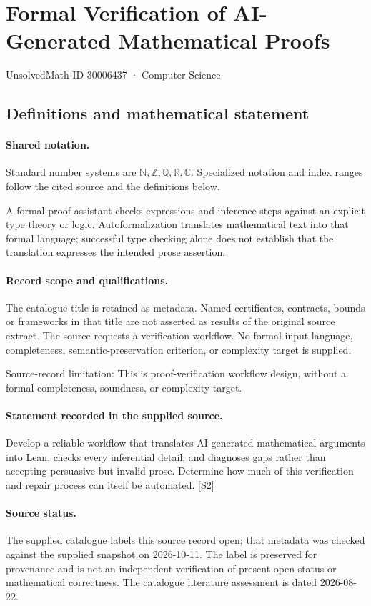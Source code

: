 \documentclass[11pt]{article}
\newcommand{\sref}[2]{\hyperlink{source:#1:#2}{[S#2]}}
\begin{document}
\setcounter{section}{30006436}
\section{Formal Verification of AI-Generated Mathematical Proofs}\label{30006437}
{\small\sffamily UnsolvedMath ID 30006437 · Computer Science}
\subsection{Definitions and mathematical statement}

\paragraph{Shared notation.}Standard number systems are $\mathbb N,\mathbb Z,\mathbb Q,\mathbb R,\mathbb C$. Specialized notation and index ranges follow the cited source and the definitions below.


A formal proof assistant checks expressions and inference steps against an explicit type theory or logic. Autoformalization translates mathematical text into that formal language; successful type checking alone does not establish that the translation expresses the intended prose assertion.
\paragraph{Record scope and qualifications.}
The catalogue title is retained as metadata. Named certificates, contracts, bounds or frameworks in that title are not asserted as results of the original source extract.
The source requests a verification workflow. No formal input language, completeness, semantic-preservation criterion, or complexity target is supplied.

Source-record limitation: This is proof-verification workflow design, without a formal completeness, soundness, or complexity target.
\paragraph{Statement recorded in the supplied source.}
Develop a reliable workflow that translates AI-generated mathematical arguments into Lean, checks every inferential detail, and diagnoses gaps rather than accepting persuasive but invalid prose. Determine how much of this verification and repair process can itself be automated. \sref{30006437}{2}
\paragraph{Source status.}
The supplied catalogue labels this source record open; that metadata was checked against the supplied snapshot on 2026-10-11. The label is preserved for provenance and is not an independent verification of present open status or mathematical correctness. The catalogue literature assessment is dated 2026-08-22.
\end{document}
